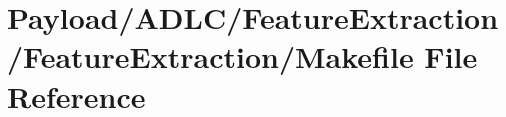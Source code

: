 \hypertarget{Payload_2ADLC_2FeatureExtraction_2FeatureExtraction_2Makefile}{\section{Payload/\-A\-D\-L\-C/\-Feature\-Extraction/\-Feature\-Extraction/\-Makefile File Reference}
\label{Payload_2ADLC_2FeatureExtraction_2FeatureExtraction_2Makefile}
}
